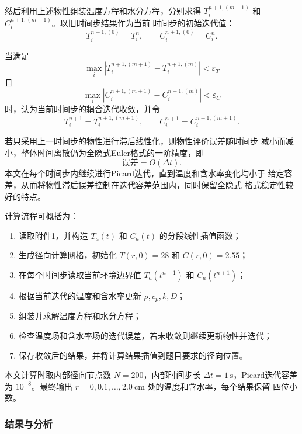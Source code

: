 \documentclass[12pt,a4paper]{article}
\begin{document}
然后利用上述物性组装温度方程和水分方程，分别求得
$T_i^{n+1,(m+1)}$ 和 $C_i^{n+1,(m+1)}$。以旧时间步结果作为当前
时间步的初始迭代值：
\begin{equation}
T_i^{n+1,(0)}=T_i^n,\qquad
C_i^{n+1,(0)}=C_i^n.
\end{equation}

当满足
\begin{equation}
\max_i
\left|T_i^{n+1,(m+1)}-T_i^{n+1,(m)}\right|
<\varepsilon_T
\end{equation}
且
\begin{equation}
\max_i
\left|C_i^{n+1,(m+1)}-C_i^{n+1,(m)}\right|
<\varepsilon_C
\end{equation}
时，认为当前时间步的耦合迭代收敛，并令
\begin{equation}
T_i^{n+1}=T_i^{n+1,(m+1)},\qquad
C_i^{n+1}=C_i^{n+1,(m+1)}.
\end{equation}

若只采用上一时间步的物性进行滞后线性化，则物性评价误差随时间步
减小而减小，整体时间离散仍为全隐式Euler格式的一阶精度，即
\begin{equation}
\mathrm{误差}=O(\Delta t).
\end{equation}
本文在每个时间步内继续进行Picard迭代，直到温度和含水率变化均小于
给定容差，从而将物性滞后误差控制在迭代容差范围内，同时保留全隐式
格式稳定性较好的特点。

计算流程可概括为：

\begin{enumerate}
\item 读取附件1，并构造 $T_a(t)$ 和 $C_a(t)$ 的分段线性插值函数；
\item 生成径向计算网格，初始化 $T(r,0)=28$ 和 $C(r,0)=2.55$；
\item 在每个时间步读取当前环境边界值 $T_a(t^{n+1})$ 和
$C_a(t^{n+1})$；
\item 根据当前迭代的温度和含水率更新 $\rho,c_p,k,D$；
\item 组装并求解温度方程和水分方程；
\item 检查温度场和含水率场的迭代误差，若未收敛则继续更新物性并迭代；
\item 保存收敛后的结果，并将计算结果插值到题目要求的径向位置。
\end{enumerate}

本文计算时取内部径向节点数 $N=200$，内部时间步长
$\Delta t=1\ \mathrm{s}$，Picard迭代容差为 $10^{-8}$。最终输出
$r=0,0.1,\ldots,2.0\ \mathrm{cm}$ 处的温度和含水率，每个结果保留
四位小数。

\subsubsection{结果与分析}
\end{document}
